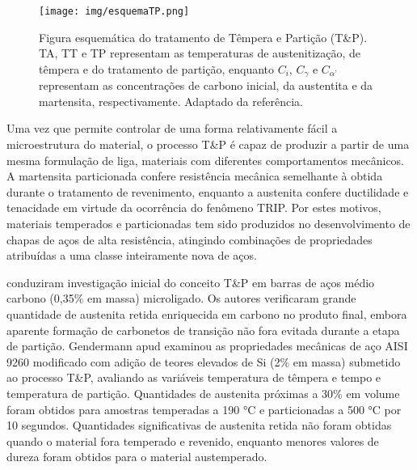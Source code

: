 \begin{figure}
	\texttt{[image: img/esquemaTP.png]}
	\caption{Figura esquemática do tratamento de Têmpera e Partição (T\&P). TA, TT e TP representam as temperaturas de austenitização, de têmpera e do tratamento de partição, enquanto $C_{i}$, $C_{\gamma}$ e $C_{\alpha\text{'}}$ representam as concentrações de carbono inicial, da austentita e da martensita, respectivamente. Adaptado da referência\cite{Edmonds2006}. }
	\label{fig:esqTP}
\end{figure}

Uma vez que permite controlar de uma forma relativamente fácil a microestrutura do material, o processo T\&P é capaz de produzir a partir de uma mesma formulação de liga, materiais com diferentes comportamentos mecânicos. A martensita particionada confere resistência mecânica semelhante à obtida durante o tratamento de revenimento, enquanto a austenita confere ductilidade e tenacidade em virtude da ocorrência do fenômeno TRIP\cite{Matlock2010}. Por estes motivos, materiais temperados e particionadas tem sido produzidos no desenvolvimento de chapas de aços de alta resistência, atingindo combinações de propriedades atribuídas a uma classe inteiramente nova de aços.

 conduziram investigação inicial do conceito T\&P em barras de aços médio carbono (0,35\% em massa) microligado. Os autores verificaram grande quantidade de austenita retida enriquecida em carbono no produto final, embora aparente formação de carbonetos de transição não fora evitada durante a etapa de partição. Gendermann apud\cite{Speer2004} examinou as propriedades mecânicas de aço AISI 9260 modificado com adição de teores elevados de Si (2\% em massa) submetido ao processo T\&P, avaliando as variáveis temperatura de têmpera e tempo e temperatura de partição. Quantidades de austenita próximas a 30\% em volume foram obtidos para amostras temperadas a 190 °C e particionadas a 500 °C por 10 segundos. Quantidades significativas de austenita retida não foram obtidas quando o material fora temperado e revenido, enquanto menores valores de dureza foram obtidos para o material austemperado.

